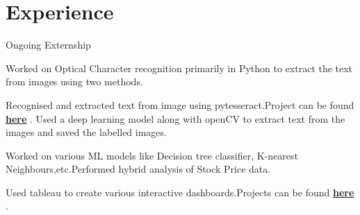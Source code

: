 \documentclass[a4paper]{deedy-resume} %
\begin{document}
\begin{minipage}[t]{0.66\textwidth} %


\section{Experience}


\vspace{\topsep} %
\begin{tightitemize}
\item Ongoing Externship
\end{tightitemize}

\sectionspace %


\begin{tightitemize}
\item Worked on Optical Character recognition primarily in  Python to extract the text from images using two methods.
\item Recognised and extracted text from image using pytesseract.Project can be found \textbf{\href{https://github.com/kritika-srivastava/OCR}{here}} . Used a deep learning model along with openCV to extract text from the images and saved the labelled images.
\end{tightitemize}
\sectionspace %


\begin{tightitemize}
\item Worked on various ML models like Decision tree classifier, K-nearest Neighbours,etc.Performed hybrid analysis of Stock Price data.
\item Used tableau to create various interactive dashboards.Projects can be found \textbf{\href{https://github.com/kritika-srivastava/The-Sparks-Foundation-Tasks}{here}} . 
\end{tightitemize}
\sectionspace %


\end{minipage}
\end{document}
